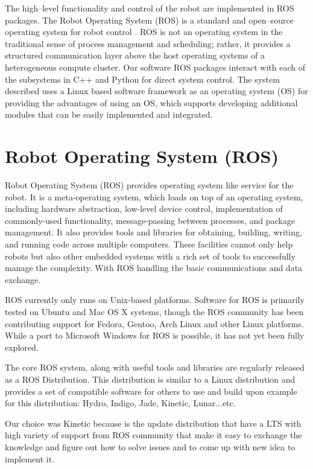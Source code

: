 
The high–level functionality and control of the robot are implemented in ROS packages. The Robot Operating System (ROS) is a standard and open–source operating system for robot control \cite{9}. ROS is not an operating system in the traditional sense of process management and scheduling; rather, it provides a structured communication layer above the host operating systems of a heterogeneous compute cluster. Our software ROS packages interact with each of the subsystems in C++ and Python for direct system control. The system described uses a Linux based software framework as an operating system (OS) for providing the advantages of using an OS, which supports developing additional modules that can be easily implemented and integrated. 

\section{Robot Operating System (ROS)}

Robot Operating System (ROS) provides operating system like service for the robot. It is a meta-operating system, which loads on top of an operating system, including hardware abstraction, low-level device control, implementation of commonly-used functionality, message-passing between processes, and package management. It also provides tools and libraries for obtaining, building, writing, and running code across multiple computers. These facilities cannot only help robots but also other embedded systems with a rich set of tools to successfully manage the complexity. With ROS handling the basic communications and data exchange.

ROS currently only runs on Unix-based platforms. Software for ROS is primarily tested on Ubuntu and Mac OS X systems, though the ROS community has been contributing support for Fedora, Gentoo, Arch Linux and other Linux platforms. While a port to Microsoft Windows for ROS is possible, it has not yet been fully explored.

The core ROS system, along with useful tools and libraries are regularly released as a ROS Distribution. This distribution is similar to a Linux distribution and provides a set of compatible software for others to use and build upon example for this distribution: Hydro, Indigo, Jade, Kinetic, Lunar...etc.

Our choice was Kinetic because is the update  distribution that have a LTS with high variety of support from ROS community that make it easy to exchange the knowledge and figure out how to solve issues and to come up with new idea to implement it. 
